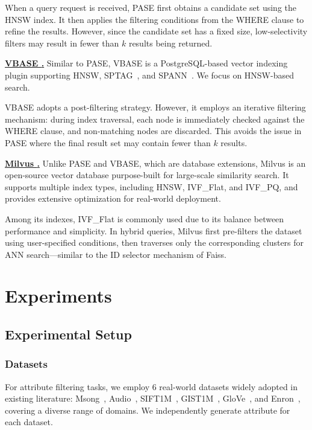 \documentclass[sigconf, nonacm]{acmart}
\begin{document}
	When a query request is received, PASE first obtains a candidate set using the HNSW index. It then applies the filtering conditions from the WHERE clause to refine the results. However, since the candidate set has a fixed size, low-selectivity filters may result in fewer than $k$ results being returned.
	
	
	\noindent\textbf{\underline{VBASE \cite{vbase}.}}  
	Similar to PASE, VBASE is a PostgreSQL-based vector indexing plugin supporting HNSW, SPTAG~\cite{sptag}, and SPANN~\cite{spann}. We focus on HNSW-based search.
	
	VBASE adopts a post-filtering strategy. However, it employs an iterative filtering mechanism: during index traversal, each node is immediately checked against the WHERE clause, and non-matching nodes are discarded. This avoids the issue in PASE where the final result set may contain fewer than $k$ results.
	
	
	\noindent\textbf{\underline{Milvus \cite{milvus}.}}  
	Unlike PASE and VBASE, which are database extensions, Milvus is an open-source vector database purpose-built for large-scale similarity search. It supports multiple index types, including HNSW, IVF\_Flat, and IVF\_PQ, and provides extensive optimization for real-world deployment.
	
	Among its indexes, IVF\_Flat is commonly used due to its balance between performance and simplicity. In hybrid queries, Milvus first pre-filters the dataset using user-specified conditions, then traverses only the corresponding clusters for ANN search—similar to the ID selector mechanism of Faiss.
	
	\section{Experiments}
	\subsection{Experimental Setup}
	\subsubsection{Datasets}
	
	For attribute filtering tasks, we employ 6 real-world datasets widely adopted in existing literature: Msong~\cite{msong2011}, Audio~\cite{audio_unknown}, SIFT1M~\cite{sift2010}, GIST1M~\cite{sift2010}, GloVe~\cite{GloVe2015}, and Enron~\cite{enron2015}, covering a diverse range of domains. We independently generate attribute for each dataset.
	
\end{document}

